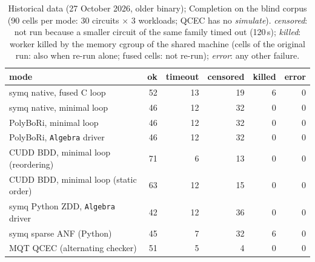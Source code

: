 \begin{table}[t]
\centering\small
\caption{Historical data (27 October 2026, older binary); Completion on the blind corpus (90 cells per mode: 30 circuits $\times$ 3 workloads; QCEC has no \emph{simulate}). \emph{censored}: not run because a smaller circuit of the same family timed out (120\,s); \emph{killed}: worker killed by the memory cgroup of the shared machine (cells of the original run: also when re-run alone; fused cells: not re-run); \emph{error}: any other failure.}
\label{tab:status}
\begin{tabular}{lrrrrr}
\toprule
mode & ok & timeout & censored & killed & error \\
\midrule
symq native, fused C loop & 52 & 13 & 19 & 6 & 0 \\
symq native, minimal loop & 46 & 12 & 32 & 0 & 0 \\
PolyBoRi, minimal loop & 46 & 12 & 32 & 0 & 0 \\
PolyBoRi, \texttt{Algebra} driver & 46 & 12 & 32 & 0 & 0 \\
CUDD BDD, minimal loop (reordering) & 71 & 6 & 13 & 0 & 0 \\
CUDD BDD, minimal loop (static order) & 63 & 12 & 15 & 0 & 0 \\
symq Python ZDD, \texttt{Algebra} driver & 42 & 12 & 36 & 0 & 0 \\
symq sparse ANF (Python) & 45 & 7 & 32 & 6 & 0 \\
MQT QCEC (alternating checker) & 51 & 5 & 4 & 0 & 0 \\
\bottomrule
\end{tabular}
\end{table}
